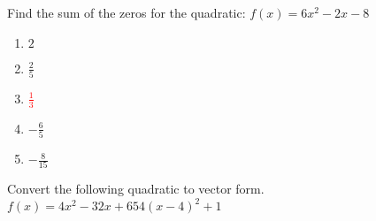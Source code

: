 Find the sum of the zeros for the quadratic: 
         $f(x)=6 x^{2} - 2 x - 8$
    \begin{enumerate}
        \item  $ 2 $
        \item  $ \frac{2}{5} $
        \item \textcolor{red}{$ \frac{1}{3} $}
        \item  $ - \frac{6}{5} $
        \item  $ - \frac{8}{15} $
    \end{enumerate}

Convert the following quadratic to vector form.$f(x)=4 x^{2} - 32 x + 65

4 \left(x - 4\right)^{2} + 1
$